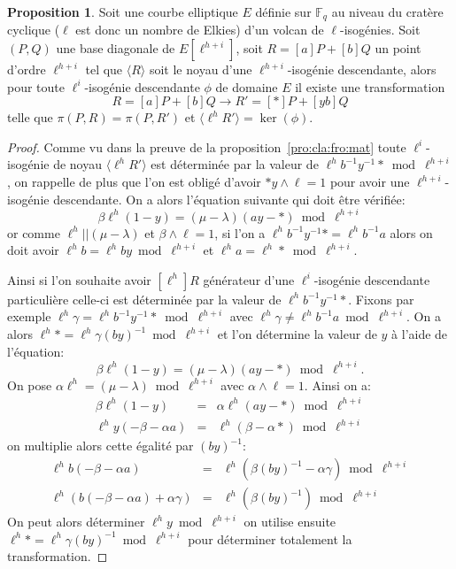 \documentclass[10pt,a4paper]{book}
\theoremstyle{plain}
\theoremstyle{definition}
\theoremstyle{definition}
\theoremstyle{definition}
\newtheorem{prop}[thm]{Proposition}
\theoremstyle{definition}
\theoremstyle{remark}
\theoremstyle{remark}
\theoremstyle{definition}
\begin{document}
\begin{prop}\label{pro:app:inv:fro}
Soit une courbe elliptique $E$ définie sur $\mathbb{F}_q$ au niveau du cratère 
cyclique ($\ell$ est donc un nombre de Elkies) d'un volcan de $\ell$-isogénies.
Soit $(P,Q)$ une base diagonale de $E[\ell^{h+i}]$, soit $R=[a]P+[b]Q$ un point
d'ordre $\ell^{h+i}$ tel que $\langle R \rangle$ soit le noyau d'une 
$\ell^{h+i}$-isogénie descendante, alors pour toute $\ell^i$-isogénie 
descendante $\phi$ de domaine $E$ il existe une transformation 
\begin{equation*}
R=[a]P+[b]Q \rightarrow R'=[*]P+[yb]Q
\end{equation*}
telle que $\pi(P,R)=\pi(P,R')$ et $\langle \ell^{h}R' \rangle = \ker(\phi)$.
\end{prop}

\begin{proof}
Comme vu dans la preuve de la proposition~\ref{pro:cla:fro:mat} toute 
$\ell^i$-isogénie de noyau $\langle \ell^{h}R' \rangle$ est déterminée par la 
valeur de $\ell^{h}b^{-1}y^{-1}* \bmod \ell^{h+i}$, on rappelle de plus que l'on est obligé 
d'avoir $*y \wedge \ell =1$ pour avoir une $\ell^{h+i}$-isogénie descendante.
On a alors l'équation suivante qui doit être vérifiée: 
\[ \beta \ell^h (1-y) = (\mu - \lambda) (ay-*)  \bmod \ell^{h+i} \]
or comme $\ell^{h}|| (\mu - \lambda)$ et $\beta \wedge \ell =1$, si l'on a 
$\ell^{h}b^{-1}y^{-1}*=\ell^{h}b^{-1}a$ alors on doit avoir 
$\ell^{h}b=\ell^{h}by \bmod \ell^{h+i}$ et $\ell^{h}a=\ell^{h}* \bmod 
\ell^{h+i}$.

Ainsi si l'on souhaite avoir $[\ell^{h}]R$ générateur d'une $\ell^i$-isogénie 
descendante particulière celle-ci est déterminée par la valeur de 
$\ell^{h}b^{-1}y^{-1}*$. Fixons par exemple $\ell^h\gamma = \ell^{h}b^{-1}y^{-1}* \bmod \ell^{h+i}$
avec $\ell^{h}\gamma \neq \ell^{h}b^{-1}a \bmod \ell^{h+i}$.
On a alors $\ell^{h}*=\ell^{h}\gamma(by)^{-1} \bmod \ell^{h+i}$ et l'on 
détermine la valeur de $y$ à l'aide de l'équation:
\[ \beta \ell^h (1-y) = (\mu - \lambda) (ay-*)  \bmod \ell^{h+i}. \]
On pose $\alpha \ell^h = (\mu -\lambda) \bmod \ell^{h+i}$ avec $\alpha \wedge 
\ell =1$. Ainsi on a:
\begin{eqnarray*}
\beta \ell^h (1-y) 	&=& \alpha \ell^{h} (ay-*)  \bmod \ell^{h+i} \\
\ell^{h}y(-\beta -\alpha a)	&=& \ell^{h}(\beta - \alpha *) \bmod \ell^{h+i}
\end{eqnarray*}
on multiplie alors cette égalité par $(by)^{-1}$:
\begin{eqnarray*}
\ell^{h}b(-\beta - \alpha a)			&=& \ell^{h}(\beta (by)^{-1}- \alpha \gamma) \bmod \ell^{h+i} \\
\ell^{h}(b(-\beta - \alpha a)+ \alpha \gamma)	&=& \ell^{h}(\beta(by)^{-1}) \bmod \ell^{h+i}
\end{eqnarray*}
On peut alors déterminer $\ell^h y \bmod \ell^{h+i}$ on utilise ensuite 
$\ell^{h}*=\ell^{h}\gamma(by)^{-1} \bmod \ell^{h+i}$ pour déterminer totalement
la transformation.
\end{proof}
\end{document}
